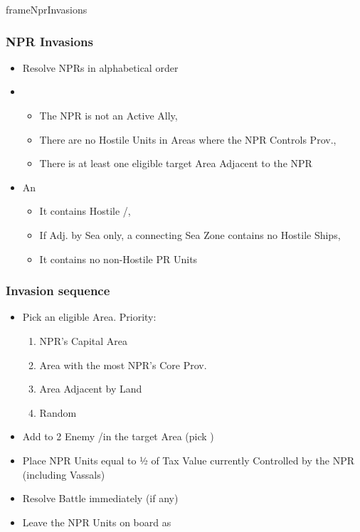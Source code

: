 \documentclass[10pt]{article}
\begin{document}
\begin{dynamiccontents*}{frameNprInvasions}
	\begin{multicols}{2}
		\subsubsection*{NPR Invasions }
		\begin{itemize}
			\item Resolve NPRs in alphabetical order
			\item {}
			\begin{itemize}
				\item The NPR is not an Active Ally, 
				\item There are no Hostile Units in Areas where the NPR Controls Prov., 
				\item There is at least one eligible target Area Adjacent to the NPR
			\end{itemize}
			\item An 
			\begin{itemize}
				\item It contains Hostile \towns/\vassals, 
				\item If Adj. by Sea only, a connecting Sea Zone contains no Hostile Ships, 
				\item It contains no non-Hostile PR Units
			\end{itemize}
		\end{itemize}
		\subsubsection*{Invasion sequence}
		\begin{itemize}
			\item Pick an eligible Area. Priority:
			\begin{enumerate}
				\item NPR's Capital Area
				\item Area with the most NPR's Core Prov.
				\item Area Adjacent by Land
				\item Random
			\end{enumerate}
			\item Add \unrest to 2 Enemy \towns/\vassals in the target Area (pick \az)
			\item Place NPR Units equal to ½ of Tax Value currently Controlled by the NPR (including Vassals)
			\item Resolve Battle immediately (if any)
			\item Leave the NPR Units on board as \rebels
		\end{itemize}
	\end{multicols}	
\end{dynamiccontents*}
\end{document}
